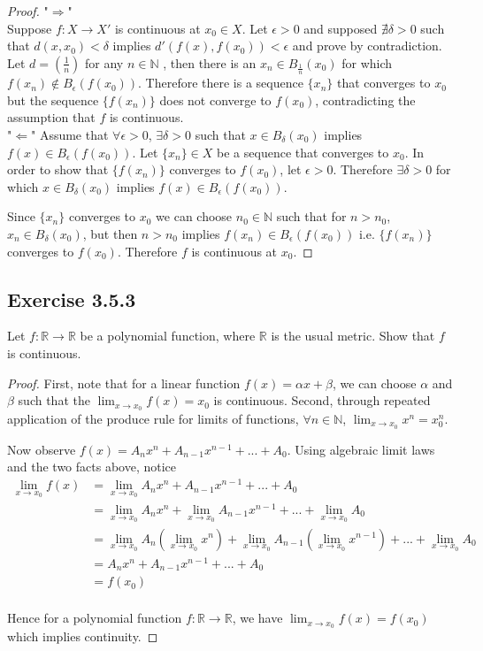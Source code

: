 \documentclass{tufte-book}
\theoremstyle{mytheoremstyle}
\theoremstyle{mylemstyle}
\theoremstyle{mydefstyle}
\begin{document}
\begin{proof}"$\Rightarrow$"\\
Suppose $f: X \rightarrow X'$ is continuous at $x_0 \in X$.  Let $\epsilon > 0$ and supposed $\nexists \delta>0$ such that $d(x, x_0) < \delta$ implies $d'(f(x), f(x_0)) < \epsilon$ and prove by contradiction.\\
Let $d = (\frac{1}{n})$ for any $n \in \mathbb{N}$ , then there is an $x_n \in B_\frac{1}{n}(x_0)$ for which $f(x_n) \not\in B_\epsilon(f(x_0))$.  Therefore there is a sequence $\{x_n\}$ that converges to $x_0$  but the sequence $\{f(x_n)\}$ does not converge to $f(x_0)$, contradicting the assumption that $f$ is continuous. \\
"$\Leftarrow$"
Assume that $\forall \epsilon > 0$, $\exists \delta >0$ such that $x \in B_\delta(x_0)$ implies $f(x) \in B_\epsilon(f(x_0))$.  Let $\{x_n\} \in X$ be a sequence that converges to $x_0$.  In order to show that $\{f(x_n)\}$ converges to $f(x_0)$, let $\epsilon >0$.  Therefore $\exists \delta >0$ for which $x \in B_\delta(x_0)$ implies $f(x) \in B_\epsilon(f(x_0))$.

Since $\{x_n\}$ converges to $x_0$ we can choose $n_0 \in \mathbb{N}$ such that for $n > n_0$, $x_n \in B_\delta(x_0)$, but then $n > n_0$ implies $f(x_n) \in B_\epsilon(f(x_0))$ i.e. $\{f(x_n)\}$ converges to $f(x_0)$.  Therefore $f$ is continuous at $x_0$.
\end{proof}

\subsection{Exercise 3.5.3}
Let $f: \mathbb{R} \rightarrow \mathbb{R}$ be a polynomial function, where $\mathbb{R}$ is the usual metric.  Show that $f$ is continuous.

\begin{proof}
First, note that for a linear function $f(x) = \alpha x + \beta$, we can choose $\alpha$ and $\beta$ such that the $\lim_{x \to x_0} f(x) = x_0$ is continuous.  Second, through repeated application of the produce rule for limits of functions, $\forall n \in \mathbb{N}$, $\lim_{x \to x_0} x^n = x_0^n$.

Now observe $f(x) = A_nx^n + A_{n-1}x^{n-1}+...+A_0$.  Using algebraic limit laws and the two facts above, notice
\begin{align*}
\lim_{x \to x_0} f(x) &= \lim_{x \to x_0}  A_nx^n + A_{n-1}x^{n-1}+...+A_0\\
&=  \lim_{x \to x_0} A_nx^n + \lim_{x \to x_0} A_{n-1}x^{n-1}+...+\lim_{x \to x_0} A_0\\
&= \lim_{x \to x_0} A_n (\lim_{x \to x_0}x^n) + \lim_{x \to x_0} A_{n-1} (\lim_{x \to x_0}x^{n-1})+...+\lim_{x \to x_0} A_0\\
&= A_nx^n + A_{n-1}x^{n-1}+...+A_0\\
&= f(x_0)\\
\end{align*}

Hence for a polynomial function $f: \mathbb{R} \rightarrow \mathbb{R}$, we have $\lim_{x \to x_0} f(x) = f(x_0)$ which implies continuity.
\end{proof}
\end{document}
